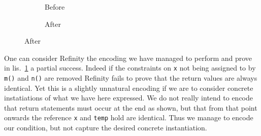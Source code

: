 \begin{figure}[!htb]
  \centering
  \begin{subfigure}{.4\linewidth}
    
    \caption{Before}
  \end{subfigure}\hspace{1cm}
  \begin{subfigure}{.4\linewidth}
    
    \caption{After}
  \end{subfigure}
\label{lst:ExtractVariable-refinity}
\end{figure}

One can consider Refinity the encoding we have managed to perform and prove in lis.~\ref{lst:ExtractVariable-refinity} a partial success. Indeed if the constraints on
\lstinline[style=refinity]|x| not being assigned to by \lstinline[style=refinity]|m()| and \lstinline[style=refinity]|n()| are removed Refinity fails to prove that
the return values are always identical. Yet this is a slightly unnatural encoding if we are to consider concrete instatiations of what we have here expressed. We do
not really intend to encode that return statements must occur at the end as shown, but that from that point onwards the reference \lstinline[style=refinity]|x| and
\lstinline[style=refinity]|temp| hold are identical. Thus we manage to encode our condition, but not capture the desired concrete instantiation.
